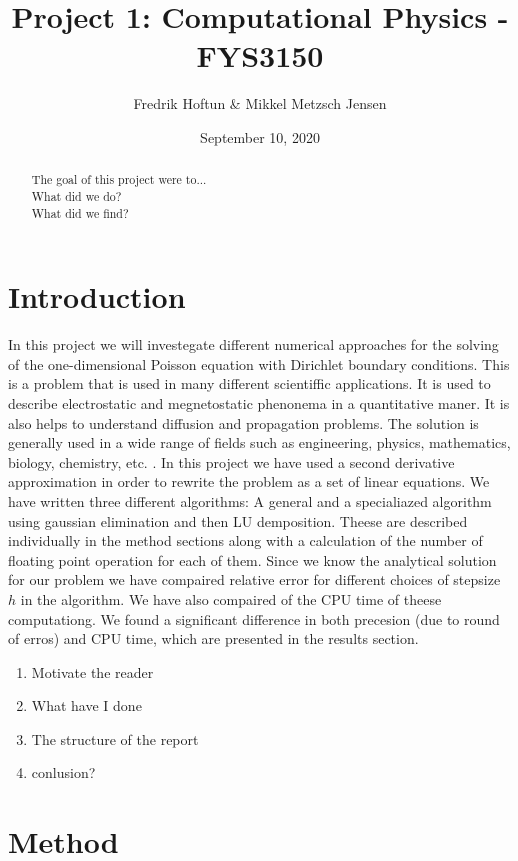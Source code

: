 \documentclass[american,a4paper,12pt]{article}
\title{Project 1: Computational Physics - FYS3150}
\author{Fredrik Hoftun \& Mikkel Metzsch Jensen}
\date{September 10, 2020}
\begin{document}
\maketitle

\tableofcontents


\begin{abstract}
  The goal of this project were to... \\
  What did we do? \\
  What did we find? \\
\end{abstract}

\section{Introduction}
  In this project we will investegate different numerical approaches for the solving of the one-dimensional Poisson equation with Dirichlet boundary conditions. This is a problem that is used in many different scientiffic applications. It is used to describe electrostatic and megnetostatic phenonema in a quantitative maner. It is also helps to understand diffusion and propagation problems. The solution is generally used in a wide range of fields such as engineering, physics, mathematics, biology, chemistry, etc. \cite{poisson_paper}. In this project we have used a second derivative approximation in order to rewrite the problem as a set of linear equations. We have written three different algorithms: A general and a specialiazed algorithm using gaussian elimination and then LU demposition. Theese are described individually in the method sections along with a calculation of the number of floating point operation for each of them. Since we know the analytical solution for our problem we have compaired relative error for different choices of stepsize $h$ in the algorithm. We have also compaired of the CPU time of theese computationg. We found a significant difference in both precesion (due to round of erros) and CPU time, which are presented in the results section.

  \begin{enumerate}
    \item Motivate the reader
    \item What have I done
    \item The structure of the report
    \item conlusion?
  \end{enumerate}


\section{Method}
\end{document}

